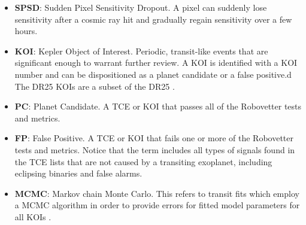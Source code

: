 \begin{itemize}
\item[] \textbf{SPSD}: Sudden Pixel Sensitivity Dropout.  A pixel can suddenly lose sensitivity after a cosmic ray hit and gradually regain sensitivity over a few hours.
\item[] \textbf{KOI}: Kepler Object of Interest. Periodic, transit-like events that are significant enough to warrant further review. A KOI is identified with a KOI number and can be dispositioned as a planet candidate or a false positive.d  The DR25 KOIs are a subset of the DR25 .
\item[] \textbf{PC}: Planet Candidate. A TCE or KOI that passes all of the Robovetter tests and metrics. 
\item[] \textbf{FP}: False Positive. A TCE or KOI that fails one or more of the Robovetter tests and metrics. Notice that the term includes all types of signals found in the TCE lists that are not caused by a transiting exoplanet, including eclipsing binaries and false alarms.
\item[] \textbf{MCMC}: Markov chain Monte Carlo. This refers to transit fits which employ a MCMC algorithm in order to provide errors for fitted model parameters for all KOIs
 \citep{Hoffman2017}.



\end{itemize}